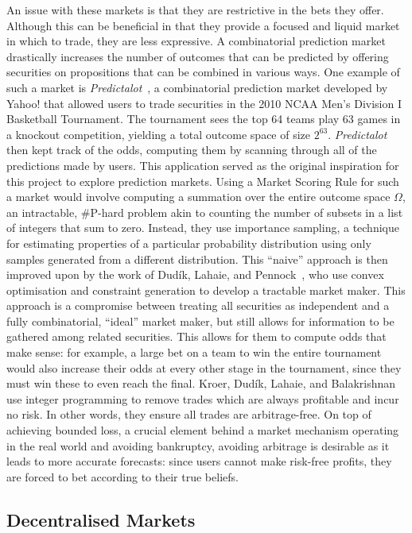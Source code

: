 An issue with these markets is that they are restrictive in the bets they
offer. Although this can be beneficial in that they provide a focused and
liquid market in which to trade, they are less expressive. A combinatorial
prediction market drastically increases the number of outcomes that can be
predicted by offering securities on propositions that can be combined in
various ways. One example of such a market is
\emph{Predictalot}~\cite{Predictalot}, a combinatorial prediction market
developed by Yahoo! that allowed users to trade securities in the 2010 NCAA
Men's Division I Basketball Tournament. The tournament sees the top 64 teams
play 63 games in a knockout competition, yielding a total outcome space of size
$2^{63}$. \emph{Predictalot} then kept track of the odds, computing them by
scanning through all of the predictions made by users. This application served
as the original inspiration for this project to explore prediction markets.
Using a Market Scoring Rule for such a market would involve computing a
summation over the entire outcome space $\Omega$, an intractable, \#P-hard
problem akin to counting the number of subsets in a list of integers that sum
to zero. Instead, they use importance sampling, a technique for estimating
properties of a particular probability distribution using only samples
generated from a different distribution. This ``naive'' approach is then
improved upon by the work of Dud\'ik, Lahaie, and Pennock~\cite{Dudik2012}, who
use convex optimisation and constraint generation to develop a tractable market
maker. This approach is a compromise between treating all securities as
independent and a fully combinatorial, ``ideal'' market maker, but still allows
for information to be gathered among related securities. This allows for them
to compute odds that make sense: for example, a large bet on a team to win the
entire tournament would also increase their odds at every other stage in the
tournament, since they must win these to even reach the final. Kroer, Dud\'ik,
Lahaie, and Balakrishnan~\cite{Kroer2016} use integer programming to remove
trades which are always profitable and incur no risk. In other words, they
ensure all trades are arbitrage-free. On top of achieving bounded loss, a
crucial element behind a market mechanism operating in the real world and
avoiding bankruptcy, avoiding arbitrage is desirable as it leads to more
accurate forecasts: since users cannot make risk-free profits, they are forced
to bet according to their true beliefs.

\subsection{Decentralised Markets}

